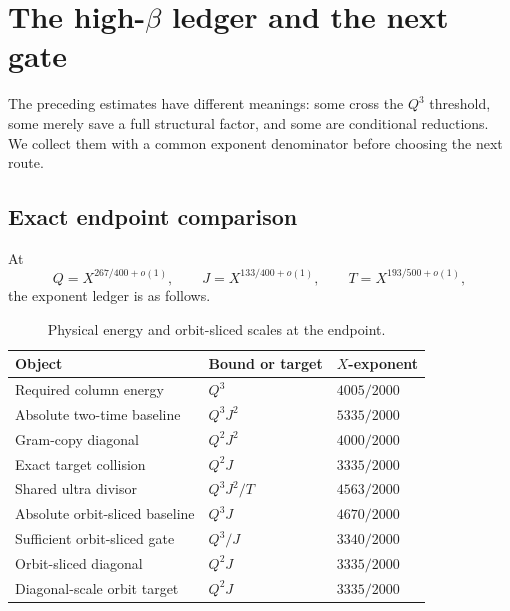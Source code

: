 \section{The high-\texorpdfstring{\(\beta\)}{beta} ledger and the next gate}
\label{sec:tpc34-high-beta}

The preceding estimates have different meanings: some cross the \(Q^3\)
threshold, some merely save a full structural factor, and some are
conditional reductions.  We collect them with a common exponent
denominator before choosing the next route.

\subsection{Exact endpoint comparison}

At
\[
 Q=X^{267/400+o(1)},\qquad
 J=X^{133/400+o(1)},\qquad
 T=X^{193/500+o(1)},
\]
the exponent ledger is as follows.

\begin{table}[H]
\centering
\caption{Physical energy and orbit-sliced scales at the endpoint.}
\label{tab:tpc34-high-beta-ledger}
\small
\begin{tabular}{@{}>{\raggedright\arraybackslash}p{}
>{\raggedright\arraybackslash}p{}
>{\raggedleft\arraybackslash}p{}@{}}
\toprule
Object & Bound or target & \(X\)-exponent \\
\midrule
Required column energy & \(Q^3\) & \(4005/2000\) \\
Absolute two-time baseline & \(Q^3J^2\) & \(5335/2000\) \\
Gram-copy diagonal & \(Q^2J^2\) & \(4000/2000\) \\
Exact target collision & \(Q^2J\) & \(3335/2000\) \\
Shared ultra divisor & \(Q^3J^2/T\) & \(4563/2000\) \\
Absolute orbit-sliced baseline & \(Q^3J\) & \(4670/2000\) \\
Sufficient orbit-sliced gate & \(Q^3/J\) & \(3340/2000\) \\
Orbit-sliced diagonal & \(Q^2J\) & \(3335/2000\) \\
Diagonal-scale orbit target & \(Q^2J\) & \(3335/2000\) \\
\bottomrule
\end{tabular}
\end{table}

